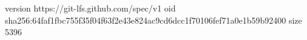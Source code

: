 version https://git-lfs.github.com/spec/v1
oid sha256:64faf1fbc755f35f04f63f2e43e824ac9cd6dcc1f70106fef71a0e1b59b92400
size 5396
